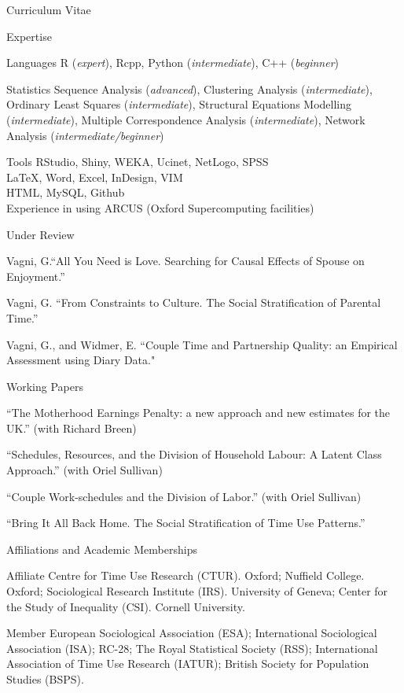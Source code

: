 \documentclass[12pt,a4paper]{article}
\newcommand*{\ac}[1]{\mbox{#1}}
\begin{document}
\begin{cv}{Curriculum Vitae}
  \begin{cvlist}{\ac{Expertise}}
  \item[Languages] R (\emph{expert}), Rcpp, Python (\emph{intermediate}),  C++ (\emph{beginner}) 
  
  \item[Statistics] Sequence Analysis (\emph{advanced}), 
  Clustering Analysis (\emph{intermediate}), 
  Ordinary Least Squares (\emph{intermediate}), Structural Equations Modelling (\emph{intermediate}), Multiple Correspondence Analysis (\emph{intermediate}), 
  Network Analysis (\emph{intermediate/beginner})
  
  \item[Tools] RStudio, Shiny, \ac{WEKA}, Ucinet, NetLogo, \ac{SPSS} \\ \LaTeX, Word, Excel, InDesign, \ac{VIM} \\ 
 \ac{HTML},  MySQL,  Github \\ 
 Experience in using ARCUS (Oxford Supercomputing facilities)
  \end{cvlist}

 \begin{cvlist}{Under Review}
 
   \item Vagni, G.``All You Need is Love. Searching for Causal Effects of Spouse on Enjoyment.'' 	
 	\item Vagni, G. ``From Constraints to Culture. The Social Stratification of Parental Time.'' 
 	\item Vagni, G., and Widmer, E. ``Couple Time and Partnership Quality: an Empirical Assessment using Diary Data."
 \end{cvlist}
 
 \begin{cvlist}{Working Papers}

  \item ``The Motherhood Earnings Penalty: a new approach and new
  estimates for the UK.'' (with Richard Breen)
  \item ``Schedules, Resources, and the Division of Household Labour: A Latent Class Approach.'' (with Oriel Sullivan)
    \item ``Couple Work-schedules and the Division of Labor.'' (with Oriel Sullivan)
  \item ``Bring It All Back Home. The Social Stratification of Time Use Patterns.''
 	 	
 \end{cvlist}

\begin{cvlist}{Affiliations and Academic Memberships}
	\item[Affiliate] Centre for Time Use Research (CTUR). Oxford; Nuffield College. Oxford; Sociological Research Institute (IRS). University of Geneva; Center for the Study of Inequality (CSI). Cornell University. 
	\item[Member] European Sociological Association (ESA); International Sociological Association (ISA); RC-28; The Royal Statistical Society (RSS); International Association of Time Use Research (IATUR); 
	British Society for Population Studies (BSPS). 
\end{cvlist}


\end{cv}
\end{document}
